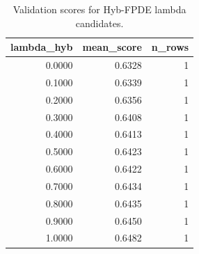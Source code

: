 \begin{table}[t]
\caption{Validation scores for Hyb-FPDE lambda candidates.}
\label{tab:lambda_distribution_computed}
\centering
\begin{tabular}{rrr}
\toprule
lambda\_hyb & mean\_score & n\_rows \\
\midrule
0.0000 & 0.6328 & 1 \\
0.1000 & 0.6339 & 1 \\
0.2000 & 0.6356 & 1 \\
0.3000 & 0.6408 & 1 \\
0.4000 & 0.6413 & 1 \\
0.5000 & 0.6423 & 1 \\
0.6000 & 0.6422 & 1 \\
0.7000 & 0.6434 & 1 \\
0.8000 & 0.6435 & 1 \\
0.9000 & 0.6450 & 1 \\
1.0000 & 0.6482 & 1 \\
\bottomrule
\end{tabular}

\end{table}
